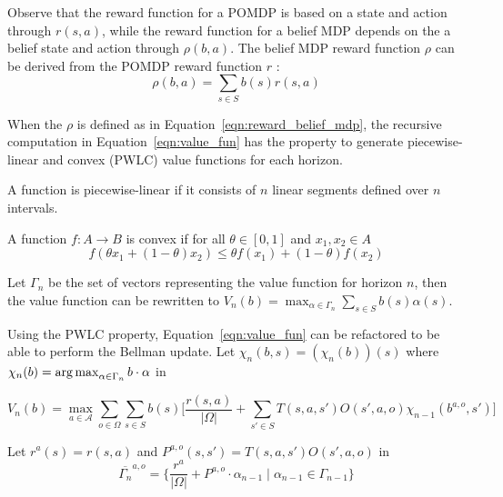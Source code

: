 Observe that the reward function for a POMDP is based on a state and action through $r(s,a)$, while the reward function for a belief MDP depends on the a belief state and action through $\rho(b,a)$. The belief MDP reward function $\rho$ can be derived from the POMDP reward function $r$ :
\begin{equation}
	\label{eqn:reward_belief_mdp}
	\rho(b,a)=\sum_{s\in S}b(s)r(s,a)
\end{equation}

When the $\rho$ is defined as in Equation~\ref{eqn:reward_belief_mdp}, the recursive computation in Equation~\ref{eqn:value_fun} has the property to generate piecewise-linear and convex (PWLC) value functions for each horizon\cite{p:pwlc}.  

\begin{definition}
	A function is piecewise-linear if it consists of $n$ linear segments defined over $n$ intervals.
\end{definition}

\begin{definition}
	A function $f:A\to B$ is convex if for all $\theta\in[0,1]$ and $x_1,x_2\in A$
	\begin{equation*}
		f(\theta x_1 + (1-\theta) x_2)\leq \theta f(x_1) + (1-\theta)f(x_2)
	\end{equation*}
\end{definition}

Let $\Gamma_n$ be the set of vectors representing the value function for horizon $n$, then the value function can be rewritten to $V_n(b)=\max_{\alpha\in\Gamma_n}\sum_{s\in S} b(s)\alpha(s)$. 

Using the PWLC property, Equation~\ref{eqn:value_fun} can be refactored to be able to perform the Bellman update. Let $\chi_n(b,s)=(\chi_n(b))(s)$ where $\chi_n(b)=\operatorname*{arg\,max}_{\alpha\in \Gamma_n} b\cdot\alpha$ in 

\begin{equation}
	V_n(b) = \max_{a\in \mathcal{A}}\sum_{o\in \Omega}\sum_{s\in S}b(s)\big[\frac{r(s,a)}{|\Omega|} + \sum_{s'\in S}T(s,a,s')O(s',a,o)\chi_{n-1}(b^{a,o},s')\big]
\end{equation}

Let $r^a(s)=r(s,a)$ and $P^{a,o}(s,s')=T(s,a,s')O(s',a,o)$ in 
\begin{equation}
	\overline{\Gamma_n}^{a,o}=\{ \frac{r^a}{|\Omega|}+P^{a,o}\cdot\alpha_{n-1}\mid\alpha_{n-1}\in\Gamma_{n-1} \}
\end{equation}

